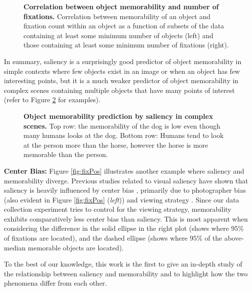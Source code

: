\begin{figure}[!htb]
\centering
{}
\vspace{-5mm}\caption{\footnotesize\textbf{Correlation between object memorability and number of fixations.} Correlation between memorability of an object and fixation count within an object as a function of subsets of the data containing at least some minimum number of objects (left) and those containing at least some minimum number of fixations (right). }\label{fig:fixCorr}
\end{figure}

In summary, saliency is a surprisingly good predictor of object memorability in simple contexts where few objects exist in an image or when an object has few interesting points, but it is a much weaker predictor of object memorability in complex scenes containing multiple objects that have many points of interest (refer to Figure \ref{fig:fixQual} for examples).

\begin{figure}[!htb]
\centering
{}
\vspace{-5mm}\caption{\footnotesize\textbf{Object memorability prediction by saliency in complex scenes.} Top row: the memorability of the dog is low even though many humans looks at the dog. Bottom row: Humans tend to look at the person more than the horse, however the horse is more memorable than the person. }\label{fig:fixQual}
\end{figure}


\noindent\textbf{Center Bias: } Figure \ref{fig:fixPos} illustrates another example where saliency and memorability diverge. Previous studies related to visual saliency have shown that saliency is heavily influenced by center bias \cite{judd09,sun08}, primarily due to photographer bias (also evident in Figure \ref{fig:fixPos} (\emph{left})) and viewing strategy \cite{tseng2009}. Since our data collection experiment tries to control for the viewing strategy, memorability exhibits comparatively less center bias than saliency. This is most apparent when considering the difference in the solid ellipse in the right plot (shows where $95\%$ of fixations are located), and the dashed ellipse (shows where $95\%$ of the above-median memorable objects are located).

To the best of our knowledge, this work is the first to give an in-depth study of the relationship between saliency and memorability and to highlight how the two phenomena differ from each other.

